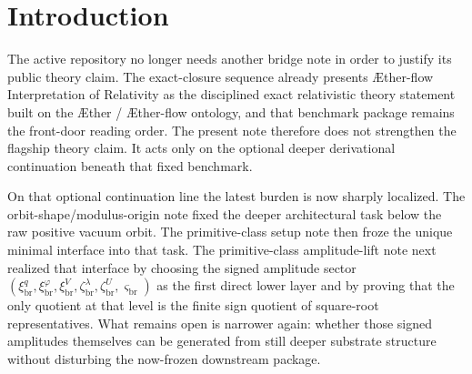 \documentclass[11pt]{article}
\newcommand{\Aether}{\AE{}ther}
\newcommand{\Aflow}{\AE{}ther-flow}
\newcommand{\TheoryName}{\Aflow{} Interpretation of Relativity}
\newcommand{\DeepReadAmp}{\xi_{\mathrm{br}}^{q}}
\newcommand{\DeepCovAmp}{\xi_{\mathrm{br}}^{\varphi}}
\newcommand{\DeepRelaxAmp}{\xi_{\mathrm{br}}^{V}}
\newcommand{\DeepWellAmp}{\zeta_{\mathrm{br}}^{\lambda}}
\newcommand{\DeepEqAmp}{\zeta_{\mathrm{br}}^{U}}
\newcommand{\DeepScaleAmp}{\varsigma_{\mathrm{br}}}
\begin{document}
\begin{abstract}
Using the frozen amplitude lift exactly as already fixed, the note then proves four facts. First, the primitive class, the readout block, the ordered kinetic pair, the radial anchor pair, and the positive orbit modulus depend only on the positive absolute-amplitude block. Second, the same raw-orbit lift is reproduced, now written as squares of composite absolute amplitudes. Third, the same downstream density/current block, the same primitive bridge-order block, the same phase-neutral minimizing branch, the same canonical profile, and the same dressed bridge map are recovered unchanged. Fourth, the only quotient structure present is still the finite polarity-forgetting quotient corresponding exactly to the old sign quotient of square-root representatives. It does not identify distinct positive moduli, and the new sector introduces no vacuum-angle locking or angle quotient. Therefore the current verdicts remain unchanged: the positive scale orbit is still a canonical-normalization orbit rather than a proved redundancy, and the global \(O(2)\) vacuum angle remains residual.

The scope is deliberately narrow. This note does not claim a unique final substrate microphysics. Its narrower positive result is that the signed amplitude layer is no longer primitive either: it is the image of an explicit deeper oriented absolute-amplitude sector through a frozen map that preserves the already-positive downstream package exactly.
\end{abstract}

\section{Introduction}

The active repository no longer needs another bridge note in order to justify its public theory claim. The exact-closure sequence already presents \TheoryName{} as the disciplined exact relativistic theory statement built on the \Aether{} / \Aflow{} ontology, and that benchmark package remains the front-door reading order. The present note therefore does not strengthen the flagship theory claim. It acts only on the optional deeper derivational continuation beneath that fixed benchmark.

On that optional continuation line the latest burden is now sharply localized. The orbit-shape/modulus-origin note fixed the deeper architectural task below the raw positive vacuum orbit. The primitive-class setup note then froze the unique minimal interface into that task. The primitive-class amplitude-lift note next realized that interface by choosing the signed amplitude sector \((\DeepReadAmp,\DeepCovAmp,\DeepRelaxAmp,\DeepWellAmp,\DeepEqAmp,\DeepScaleAmp)\) as the first direct lower layer and by proving that the only quotient at that level is the finite sign quotient of square-root representatives. What remains open is narrower again: whether those signed amplitudes themselves can be generated from still deeper substrate structure without disturbing the now-frozen downstream package.
\end{document}
